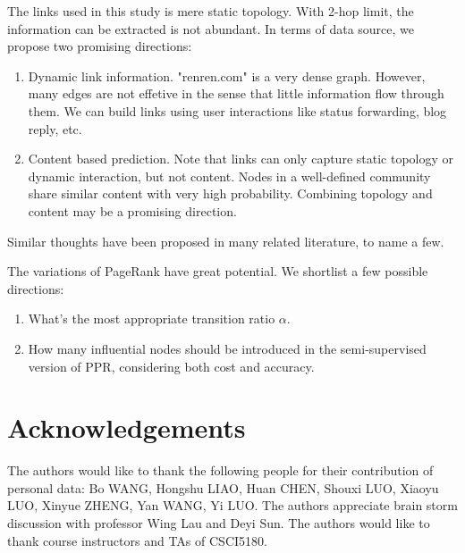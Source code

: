 \documentclass[11pt,a4paper]{article}
\begin{document}
The links used in this study is mere static topology. 
With 2-hop limit, the information can be extracted 
is not abundant. In terms of data source, we propose 
two promising directions:
\begin{enumerate}
	\item Dynamic link information. "renren.com" is a very 
	dense graph. However, many edges are not effetive in the sense
	that little information flow through them. We can 
	build links using user interactions like status forwarding, 
	blog reply, etc. 
	\item Content based prediction. Note that links can only capture
	static topology or dynamic interaction, but not content. Nodes in a 
	well-defined community share similar content with very high 
	probability. Combining topology and content may be a promising 
	direction. 
\end{enumerate}

Similar thoughts have been proposed in many related literature, to name 
a few\cite{boccaletti2006complex,aggarwal2011social}. 

The variations of PageRank have great potential. We
shortlist a few possible directions:
\begin{enumerate}
	\item What's the most appropriate transition ratio $\alpha$. 
	\item How many influential nodes should be introduced 
	in the semi-supervised version of PPR, considering
	both cost and accuracy. 
\end{enumerate}

\section*{Acknowledgements}

The authors would like to thank the following people for their contribution of 
personal data: 
Bo WANG, Hongshu LIAO, Huan CHEN, Shouxi LUO, 
Xiaoyu LUO, Xinyue ZHENG, Yan WANG, Yi LUO. 
The authors appreciate brain storm discussion with professor Wing Lau 
and Deyi Sun. 
The authors would like to thank course instructors and TAs of CSCI5180. 



%
%
%
\end{document}
